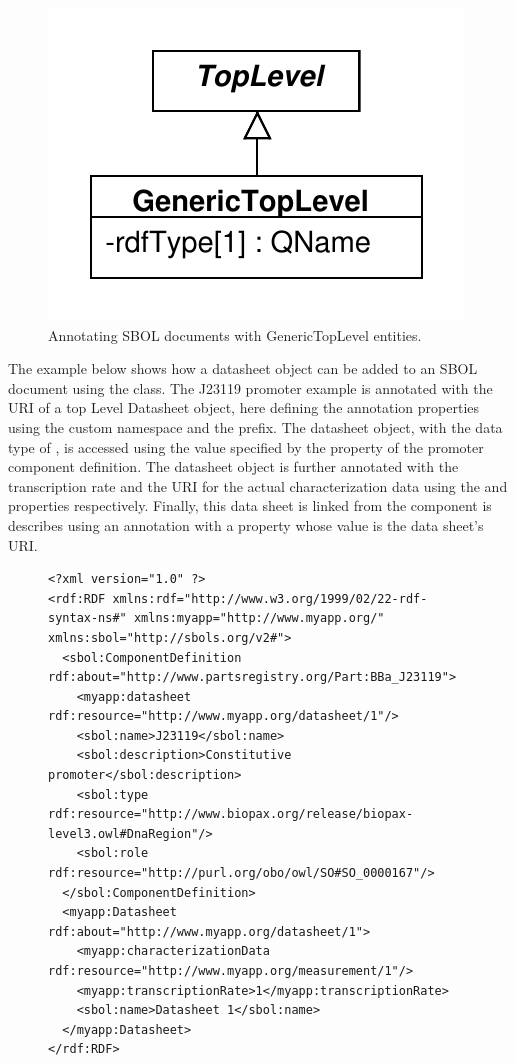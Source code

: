 \begin{figure}[ht]
\begin{center}
\includegraphics[scale=0.6]{uml/generictoplevel}
\caption[]{Annotating SBOL documents with GenericTopLevel entities.}
\label{uml:generictoplevel}
\end{center}
\end{figure}

The example below shows how a datasheet object can be added to an SBOL document using the  class. 
The J23119 promoter example is annotated with the URI of a top Level Datasheet object, here defining the annotation properties using the custom  namespace and the  prefix. 
The datasheet object, with the data type of , is accessed using the  value specified by the  property of the promoter component definition. 
The datasheet object is further annotated with the transcription rate and the URI for the actual characterization data using the  and  properties respectively.
Finally, this data sheet is linked from the component is describes using an annotation with a  property whose value is the data sheet's URI.

\begin{figure}[ht]
\begin{lstlisting}
<?xml version="1.0" ?>
<rdf:RDF xmlns:rdf="http://www.w3.org/1999/02/22-rdf-syntax-ns#" xmlns:myapp="http://www.myapp.org/" xmlns:sbol="http://sbols.org/v2#">
  <sbol:ComponentDefinition rdf:about="http://www.partsregistry.org/Part:BBa_J23119">
    <myapp:datasheet rdf:resource="http://www.myapp.org/datasheet/1"/>
    <sbol:name>J23119</sbol:name>
    <sbol:description>Constitutive promoter</sbol:description>
    <sbol:type rdf:resource="http://www.biopax.org/release/biopax-level3.owl#DnaRegion"/>
    <sbol:role rdf:resource="http://purl.org/obo/owl/SO#SO_0000167"/>
  </sbol:ComponentDefinition>
  <myapp:Datasheet rdf:about="http://www.myapp.org/datasheet/1">
    <myapp:characterizationData rdf:resource="http://www.myapp.org/measurement/1"/>
    <myapp:transcriptionRate>1</myapp:transcriptionRate>
    <sbol:name>Datasheet 1</sbol:name>
  </myapp:Datasheet>
</rdf:RDF>

\end{lstlisting}
\label{ser:GenericTopLevel}
\end{figure}